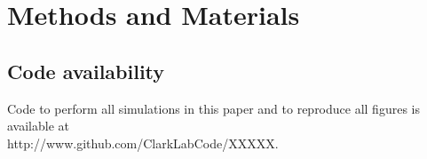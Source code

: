 \documentclass[pdftex,9pt,lineno]{elife}
\begin{document}














\newpage


\section{Methods and Materials}

\subsection{Code availability}
Code to perform all simulations in this paper and to reproduce all figures is available at \\ http://www.github.com/ClarkLabCode/XXXXX.
\end{document}
